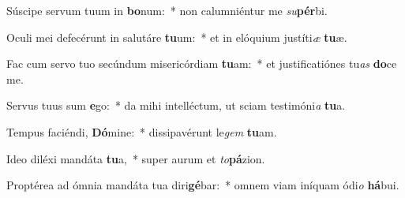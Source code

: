 \item Súscipe servum tuum in \textbf{bo}num:~* non calumniéntur me \textit{su}\textbf{pér}bi.
\item Oculi mei defecérunt in salutáre \textbf{tu}um:~* et in elóquium justíti\textit{æ} \textbf{tu}æ.
\item Fac cum servo tuo secúndum misericórdiam \textbf{tu}am:~* et justificatiónes tu\textit{as} \textbf{do}ce me.
\item Servus tuus sum \textbf{e}go:~* da mihi intelléctum, ut sciam testimóni\textit{a} \textbf{tu}a.
\item Tempus faciéndi, \textbf{Dó}mine:~* dissipavérunt le\textit{gem} \textbf{tu}am.
\item Ideo diléxi mandáta \textbf{tu}a,~* super aurum et \textit{to}\textbf{pá}zion.
\item Proptérea ad ómnia mandáta tua diri\textbf{gé}bar:~* omnem viam iníquam ódi\textit{o} \textbf{há}bui.

